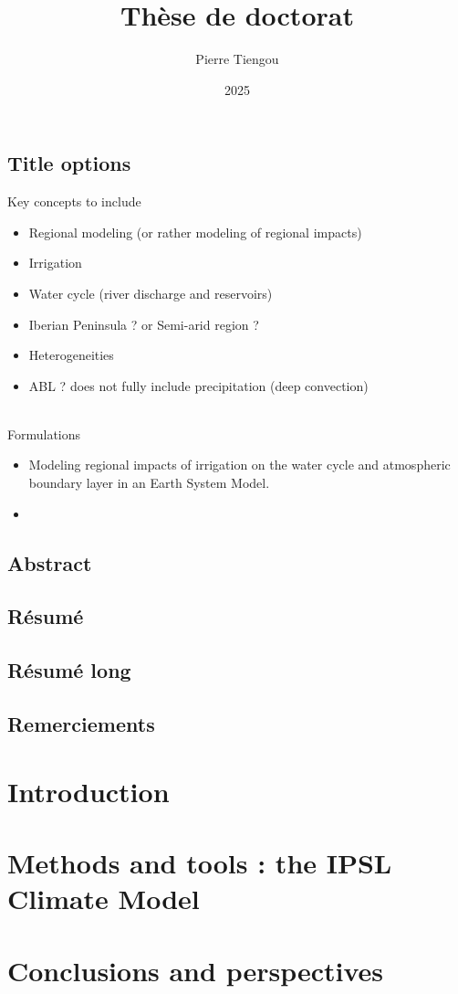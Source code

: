 \documentclass{report}
\begin{document}
\dominitoc

\section*{Title options}
    Key concepts to include
    \begin{itemize}
        \item Regional modeling (or rather modeling of regional impacts)
        \item Irrigation
        \item Water cycle (river discharge and reservoirs)
        \item Iberian Peninsula ? or Semi-arid region ? 
        \item Heterogeneities
        \item ABL ? does not fully include precipitation (deep convection)
    \end{itemize}
    \hfill
    \\
    Formulations
    \begin{itemize}
        \item Modeling regional impacts of irrigation on the water cycle and atmospheric boundary layer in an Earth System Model.
        \item 
    \end{itemize}
    
    \title{Thèse de doctorat}
    \author{Pierre Tiengou }
    \date{2025}
    \maketitle

\clearpage
\renewcommand*\contentsname{Contents}
\tableofcontents
\newpage

\section*{Abstract}
\section*{Résumé}
\section*{Résumé long}
\section*{Remerciements}

\chapter{Introduction}
\minitoc


\chapter{Methods and tools : the IPSL Climate Model}
\minitoc



\chapter{Conclusions and perspectives}

\newpage
\nocite{*} %

\newpage
\listoffigures
\newpage
\listoftables
\end{document}
